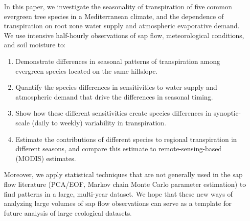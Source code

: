 In this paper, we investigate the seasonality of transpiration of five common evergreen tree species in a Mediterranean climate, and the dependence of transpiration on root zone water supply and atmospheric evaporative demand. We use intensive half-hourly observations of sap flow, meteorological conditions, and soil moisture to:
\begin{enumerate}
\item Demonstrate differences in seasonal patterns of transpiration among evergreen species located on the same hillslope.
\item Quantify the species differences in sensitivities to water supply and atmospheric demand that drive the differences in seasonal timing.
\item Show how these different sensitivities create species differences in synoptic-scale (daily to weekly) variability in transpiration.
\item Estimate the contributions of different species to regional transpiration in different seasons, and compare this estimate to remote-sensing-based (MODIS) estimates.
\end{enumerate}

Moreover, we apply statistical techniques that are not generally used in the sap flow literature (PCA/EOF, Markov chain Monte Carlo parameter estimation) to find patterns in a large, multi-year dataset.  We hope that these new ways of analyzing large volumes of sap flow observations can serve as a template for future analysis of large ecological datasets.
